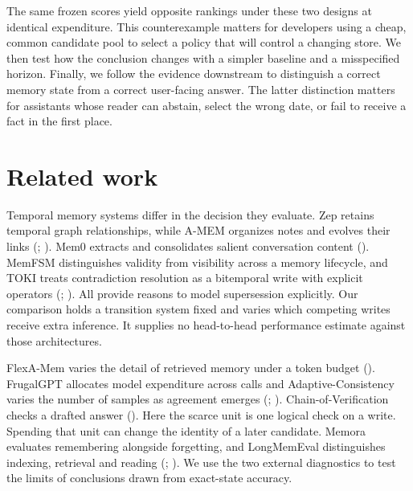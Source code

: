 \documentclass[
  11pt,
]{article}
\begin{document}
The same frozen scores yield opposite rankings under these two designs
at identical expenditure. This counterexample matters for developers
using a cheap, common candidate pool to select a policy that will
control a changing store. We then test how the conclusion changes with a
simpler baseline and a misspecified horizon. Finally, we follow the
evidence downstream to distinguish a correct memory state from a correct
user-facing answer. The latter distinction matters for assistants whose
reader can abstain, select the wrong date, or fail to receive a fact in
the first place.

\section{Related work}\label{related-work}

Temporal memory systems differ in the decision they evaluate. Zep
retains temporal graph relationships, while A-MEM organizes notes and
evolves their links (; ). Mem0 extracts and
consolidates salient conversation content
(). MemFSM
distinguishes validity from visibility across a memory lifecycle, and
TOKI treats contradiction resolution as a bitemporal write with explicit
operators (;
). All provide reasons to model
supersession explicitly. Our comparison holds a transition system fixed
and varies which competing writes receive extra inference. It supplies
no head-to-head performance estimate against those architectures.

FlexA-Mem varies the detail of retrieved memory under a token budget
(). FrugalGPT allocates
model expenditure across calls and Adaptive-Consistency varies the
number of samples as agreement emerges
(;
).
Chain-of-Verification checks a drafted answer
(). Here the
scarce unit is one logical check on a write. Spending that unit can
change the identity of a later candidate. Memora evaluates remembering
alongside forgetting, and LongMemEval distinguishes indexing, retrieval
and reading (;
). We use the two
external diagnostics to test the limits of conclusions drawn from
exact-state accuracy.
\end{document}
